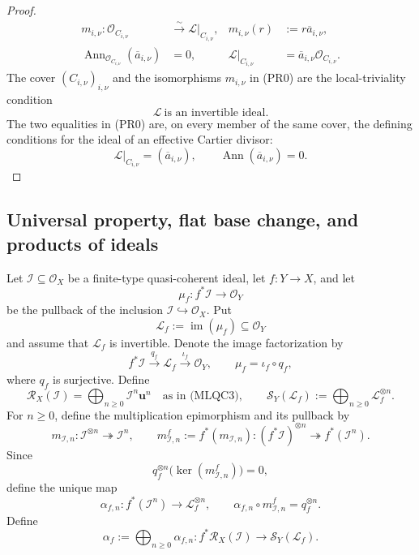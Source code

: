 \begin{proof}
\[\begin{aligned}
    m_{i,\nu}\colon\mathcal O_{C_{i,\nu}}
      &\xrightarrow{\ \sim\ }\mathcal L|_{C_{i,\nu}},&
    m_{i,\nu}(r)&:=r\overline a_{i,\nu},\\
    \operatorname{Ann}_{\mathcal O_{C_{i,\nu}}}
      (\overline a_{i,\nu})&=0,&
    \mathcal L|_{C_{i,\nu}}&=
      \overline a_{i,\nu}\mathcal O_{C_{i,\nu}}.
  \end{aligned}                                                \tag{PR0}
  \]
  The cover $(C_{i,\nu})_{i,\nu}$ and the isomorphisms $m_{i,\nu}$ in
  (PR0) are the local-triviality condition
  \[
    \mathcal L\ \text{is an invertible ideal}.
  \]
  The two equalities in (PR0) are, on every member of the same cover, the
  defining conditions for the ideal of an effective Cartier divisor:
  \[
    \mathcal L|_{C_{i,\nu}}
      =(\overline a_{i,\nu}),\qquad
    \operatorname{Ann}(\overline a_{i,\nu})=0.
  \]
\end{proof}

\subsection{Universal property, flat base change, and products of ideals}

\begin{definition}
  \label{def:nagata-blowup-universal-graded-map}
  \lean{}

  Let $\mathcal I\subseteq\mathcal O_X$ be a finite-type quasi-coherent ideal,
  let $f\colon Y\to X$, and let
  \[
    \mu_f\colon f^*\mathcal I\longrightarrow\mathcal O_Y
  \]
  be the pullback of the inclusion
  $\mathcal I\hookrightarrow\mathcal O_X$.  Put
  \[
    \mathcal L_f:=\operatorname{im}(\mu_f)\subseteq\mathcal O_Y
  \]
  and assume that $\mathcal L_f$ is invertible.  Denote the image
  factorization by
  \[
    f^*\mathcal I\xrightarrow{q_f}\mathcal L_f
      \xrightarrow{\iota_f}\mathcal O_Y,
    \qquad \mu_f=\iota_f\circ q_f,
  \]
  where $q_f$ is surjective.  Define
  \[
    \mathcal R_X(\mathcal I)
      =\bigoplus_{n\ge0}\mathcal I^n\mathbf u^n
      \quad\text{as in (MLQC3)},
    \qquad
    \mathcal S_Y(\mathcal L_f):=
      \bigoplus_{n\ge0}\mathcal L_f^{\otimes n}.
  \]
  For $n\ge0$, define the multiplication epimorphism and its pullback by
  \[
    m_{\mathcal I,n}\colon\mathcal I^{\otimes n}
      \twoheadrightarrow\mathcal I^n,
    \qquad
    m^f_{\mathcal I,n}:=f^*(m_{\mathcal I,n})\colon
      (f^*\mathcal I)^{\otimes n}\twoheadrightarrow f^*(\mathcal I^n).
  \]
  Since
  \[
    q_f^{\otimes n}\bigl(\ker(m^f_{\mathcal I,n})\bigr)=0,
  \]
  define the unique map
  \[
    \alpha_{f,n}\colon f^*(\mathcal I^n)
      \longrightarrow\mathcal L_f^{\otimes n},
    \qquad
    \alpha_{f,n}\circ m^f_{\mathcal I,n}=q_f^{\otimes n}.
  \]
  Define
  \[
    \alpha_f:=\bigoplus_{n\ge0}\alpha_{f,n}\colon
      f^*\mathcal R_X(\mathcal I)
      \longrightarrow\mathcal S_Y(\mathcal L_f).
  \]
\end{definition}


